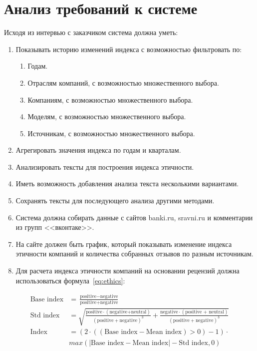 \documentclass[PI, VKR]{HSEUniversity}
\begin{document}
\section{Анализ требований к системе}
\label{sec:orgf926a3b}
Исходя из интервью с заказчиком система должна уметь:
\begin{enumerate}
\item Показывать историю изменений индекса с возможностью фильтровать по:
\begin{enumerate}
\item Годам.
\item Отраслям компаний, с возможностью множественного выбора.
\item Компаниям, с возможностью множественного выбора.
\item Моделям, с возможностью множественного выбора.
\item Источникам, с возможностью множественного выбора.
\end{enumerate}
\item Агрегировать значения индекса по годам и кварталам.
\item Анализировать тексты для построения индекса этичности.
\item Иметь возможность добавления анализа текста несколькими вариантами.
\item Сохранять тексты для последующего анализа другими методами.
\item Система должна собирать данные с сайтов banki.ru, sravni.ru и комментарии из групп {}<<вконтаке>>{}.
\item На сайте должен быть график, который показывать изменение индекса этичности компаний и количества собранных отзывов по разным источникам.
\item Для расчета индекса этичности компаний на основании рецензий должна использоваться формула~\ref{eq:ethics}:
\end{enumerate}
\begin{equation}
\label{eq:ethics}
\begin{aligned}
\text{Base index} &= \frac{\text{positive} - \text{negative}}{\text{positive} + \text{negative}} \\
\text{Std index} &= \sqrt{\frac{\text{positive}\cdot(\text{negative+neutral})}{(\text{positive} + \text{negative})^{3}} + \frac{\text{negative}\cdot(\text{positive + neutral})}{(\text{positive} + \text{negative})^{3}}} \\
\text{Index} &= ({2\cdot(({\text{Base index}}-{\text{Mean index}}) > 0) - 1})\cdot\\
            &{max\left(\left|{\text{Base index}}-{\text{Mean index}}\right|-{\text{Std index}}, 0\right)}
\end{aligned}
\end{equation}
\end{document}
